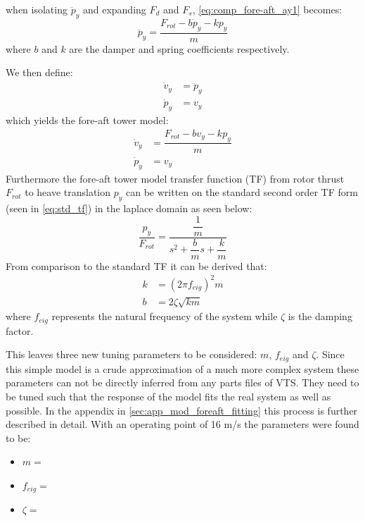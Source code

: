 when isolating $ \ddot{p}_y $ and expanding $ F_d $ and $ F_s $, \cref{eq:comp_fore-aft_ay1} becomes:
\begin{equation}\label{eq:comp_fore-aft_ay2}
	\ddot{p}_y = \dfrac{F_{rot} - b \dot{p}_y - k p_y}{m}
\end{equation}
where $ b $ and $ k $ are the damper and spring coefficients respectively.

We then define:
\begin{align}
	\dot{v}_y & = \ddot{p}_y \label{eq:comp_fore-aft_ay} \\
	\dot{p}_y & = v_y \label{eq:comp_fore-aft_vy}
\end{align}
which yields the fore-aft tower model:
\begin{align}
	\dot{v}_y & = \dfrac{F_{rot} - b v_y - k p_y}{m}  \label{eq:comp_fore-aft_1} \\
	\dot{p}_y & = v_y \label{eq:comp_fore-aft_2}
\end{align}
Furthermore the fore-aft tower model transfer function (TF) from rotor thrust $ F_{rot} $ to heave translation $ p_y $ can be written on the standard second order TF form (seen in \cref{eq:std_tf}) in the laplace domain as seen below:
\begin{equation}\label{eq:comp_fore_aft_tf}
	\dfrac{p_y}{F_{rot}} = \dfrac{\dfrac{1}{m}}{s^2 + \dfrac{b}{m} s + \dfrac{k}{m}}
\end{equation}
From comparison to the standard TF it can be derived that:
\begin{align}
	k & = (2 \pi f_{eig})^2 m \label{eq:comp_fore_aft_tf_k} \\
	b & = 2 \zeta \sqrt{k m} \label{eq:comp_fore_aft_tf_b}
\end{align}
where $ f_{eig} $ represents the natural frequency of the system while $ \zeta $ is the damping factor. 

This leaves three new tuning parameters to be considered: $ m $, $ f_{eig} $ and $ \zeta $. Since this simple model is a crude approximation of a much more complex system these parameters can not be directly inferred from any parts files of VTS. They need to be tuned such that the response of the model fits the real system as well as possible. In the appendix in \cref{sec:app_mod_foreaft_fitting} this process is further described in detail. With an operating point of 16 m/s the parameters were found to be:
\begin{itemize}
	\item $ m =  $
	\item $ f_{eig} =  $
	\item $ \zeta =  $
\end{itemize}


